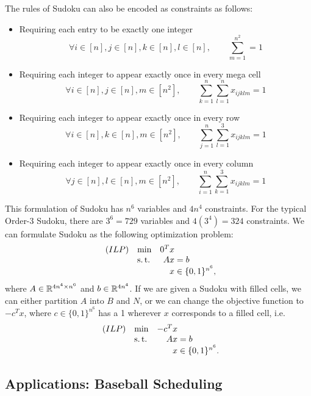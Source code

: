 The rules of Sudoku can also be encoded as constraints as follows:
\begin{itemize}
    \item Requiring each entry to be exactly one integer
    \[
        \forall i \in [n], j \in [n], k \in [n], l \in [n], \quad\quad \sum_{m=1}^{n^2} = 1
    \]
    \item Requiring each integer to appear exactly once in every mega cell
    \[
        \forall i \in [n], j \in [n], m \in [n^2], \quad\quad \sum_{k=1}^n \sum_{l=1}^n x_{ijklm} = 1
    \]
    \item Requiring each integer to appear exactly once in every row
    \[
        \forall i \in [n], k \in [n], m \in [n^2], \quad\quad \sum_{j=1}^n\sum_{l=1}^3 x_{ijklm} = 1
    \]
    \item Requiring each integer to appear exactly once in every column
    \[
        \forall j \in [n], l \in [n], m \in [n^2], \quad\quad \sum_{i=1}^n\sum_{k=1}^3 x_{ijklm} = 1
    \]
\end{itemize}
This formulation of Sudoku has $n^6$ variables and $4n^4$ constraints. For the typical Order-3 Sudoku, there are $3^6 = 729$ variables and $4(3^4) = 324$ constraints. We can formulate Sudoku as the following optimization problem:
    \begin{equation*}
        \begin{array}{llr@{}l@{}}
            (ILP)   & \min  & 0^T x &                   \\
                    & \st   & Ax    & {}= b             \\
                    &       &  x    & {}\in \{0, 1\}^{n^6},
        \end{array}
    \end{equation*}
where $A \in \mathbb R^{4n^4 \times n^6}$ and $b \in \mathbb R^{4n^4}$. If we are given a Sudoku with filled cells, we can either partition $A$ into $B$ and $N$, or we can change the objective function to $-c^Tx$, where $c \in \{0, 1\}^{n^6}$ has a 1 wherever $x$ corresponds to a filled cell, i.e.
    \begin{equation*}
        \begin{array}{llr@{}l@{}}
            (ILP)   & \min  & -c^Tx &                   \\
                    & \st   & Ax    & {}= b             \\
                    &       &  x    & {}\in \{0, 1\}^{n^6}.
        \end{array}
    \end{equation*}
    
    
\subsection{Applications: Baseball Scheduling}
\label{subsec:applications-baseball-scheduling}